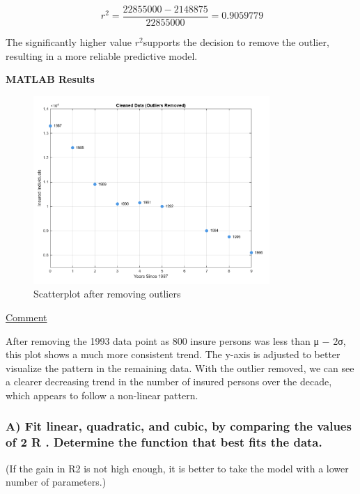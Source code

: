 \documentclass[12pt]{article}
\begin{document}
\[
\ r^2 = \frac{22855000 - 2148875}{22855000} = 0.9059779
\]
\begin{adjustwidth}{0cm}{0cm}
The significantly higher value \(r^2\)supports the decision to remove the outlier, resulting in
a more reliable predictive model. 
\end{adjustwidth}

\newpage
\begin{adjustwidth}{0cm}{0cm}
\textbf{MATLAB Results}
\end{adjustwidth}
\begin{figure}[H]
    \centering
    \includegraphics[width=0.8\textwidth]{4.png}
    \caption{Scatterplot after removing outliers}
\end{figure} 
\begin{adjustwidth}{0cm}{0cm}
\uline{Comment}
\end{adjustwidth}
After removing the 1993 data point as 800 insure persons was less than μ − 2σ, this plot
shows a much more consistent trend. The y-axis is adjusted to better visualize the pattern in
the remaining data. With the outlier removed, we can see a clearer decreasing trend in the
number of insured persons over the decade, which appears to follow a non-linear pattern.
\newpage
\subsubsection*{A) Fit linear, quadratic, and cubic, by comparing the values of 2 R . Determine the
function that best fits the data.}

(If the gain in R2 is not high enough, it is better to take the model with a lower number of parameters.)
\end{document}
